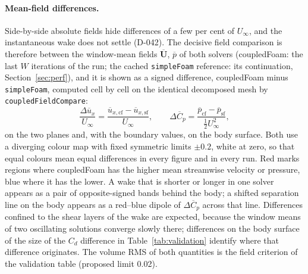 \documentclass[11pt,a4paper]{article}
\newcommand{\vect}[1]{\mathbf{#1}}
\newcommand{\Uv}{\vect{U}}
\newcommand{\code}[1]{\texttt{#1}}
\begin{document}
\paragraph{Mean-field differences.} Side-by-side absolute fields hide
differences of a few per cent of $U_\infty$, and the instantaneous wake does
not settle (D-042). The decisive field comparison is therefore between the
window-mean fields $\overline{\Uv}$, $\overline{p}$ of both solvers
(coupledFoam: the last $W$ iterations of the run; the cached
\code{simpleFoam} reference: its continuation, Section~\ref{sec:perf}),
and it is shown as a signed
difference, coupledFoam minus \code{simpleFoam}, computed cell by cell on
the identical decomposed mesh by \code{coupledFieldCompare}:
\begin{equation}
  \frac{\Delta\overline{u}_x}{U_\infty}
    =\frac{\overline{u}_{x,\mathrm{cf}}-\overline{u}_{x,\mathrm{sf}}}{U_\infty},
  \qquad
  \Delta\overline{C}_p
    =\frac{\overline{p}_{\mathrm{cf}}-\overline{p}_{\mathrm{sf}}}{\tfrac12U_\infty^2},
  \label{eq:meandelta}
\end{equation}
on the two planes and, with the boundary values, on the body surface. Both
use a diverging colour map with fixed symmetric limits $\pm0.2$, white at
zero, so that equal colours mean equal differences in every figure and in
every run. Red marks regions where coupledFoam has the higher mean
streamwise velocity or pressure, blue where it has the lower. A wake that is
shorter or longer in one solver appears as a pair of opposite-signed bands
behind the body; a shifted separation line on the body appears as a
red--blue dipole of $\Delta\overline{C}_p$ across that line. Differences
confined to the shear layers of the wake are expected, because the window
means of two oscillating solutions converge slowly there; differences on
the body surface of the size of the $C_d$ difference in
Table~\ref{tab:validation} identify where that difference originates. The
volume RMS of both quantities is the field criterion of the validation
table (proposed limit 0.02).
\end{document}

